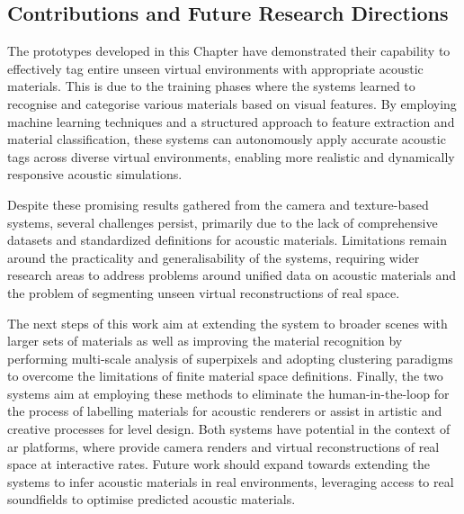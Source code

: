 \subsection{Contributions and Future Research Directions}
The prototypes developed in this Chapter have demonstrated their capability to effectively tag entire unseen virtual environments with appropriate acoustic materials. This is due to the training phases where the systems learned to recognise and categorise various materials based on visual features. By employing machine learning techniques and a structured approach to feature extraction and material classification, these systems can autonomously apply accurate acoustic tags across diverse virtual environments, enabling more realistic and dynamically responsive acoustic simulations.\par
Despite these promising results gathered from the camera and texture-based systems, several challenges persist, primarily due to the lack of comprehensive datasets and standardized definitions for acoustic materials. Limitations remain around the practicality and generalisability of the systems, requiring wider research areas to address problems around unified data on acoustic materials and the problem of segmenting unseen virtual reconstructions of real space. \par

The next steps of this work aim at extending the system to broader scenes with larger sets of materials as well as improving the material recognition by performing multi-scale analysis of superpixels and adopting clustering paradigms to overcome the limitations of finite material space definitions. Finally, the two systems aim at employing these methods to eliminate the human-in-the-loop for the process of labelling materials for acoustic renderers or assist in artistic and creative processes for level design. 
Both systems have potential in the context of \acrshort{ar} platforms, where  provide camera renders and virtual reconstructions of real space at interactive rates. Future work should expand towards extending the systems to infer acoustic materials in real environments, leveraging access to real soundfields to optimise predicted acoustic materials.


